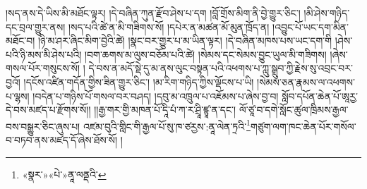 །སད་ནས་དེ་ཡིས་མི་མཐོང་ལྟར། །དེ་བཞིན་ཀུན་རྫོབ་ཤེས་པ་དག །བློ་གྲོས་མིག་ནི་བྱེ་གྱུར་ཅིང་། །མི་ཤེས་གཉིད་དང་བྲལ་གྱུར་ནས། །སད་པའི་ཚེ་ན་མི་གཟིགས་སོ། །དཔེར་ན་མཚན་མོ་མུན་ཁྲོད་ན། །འབྱུང་པོ་ཡང་དག་མིན་མཐོང་བ། །ཉི་མ་ཤར་ཞིང་མིག་བྱེའི་ཚེ། །སྣང་བར་གྱུར་པ་མ་ཡིན་ལྟར། །དེ་བཞིན་མཁས་པས་ཡང་དག་གི །ཤེས་པའི་ཉི་མས་མི་ཤེས་པའི། །བག་ཆགས་མ་ལུས་བཅོམ་པའི་ཚེ། །སེམས་དང་སེམས་བྱུང་ཡུལ་མི་གཟིགས། །ཞེས་གསལ་པོར་གསུངས་སོ། །
དེ་བས་ན་མདོ་སྡེ་དུ་མ་ནས་ལུང་བསྟན་པའི་འཕགས་པ་ཀླུ་སྒྲུབ་ཀྱི་རྗེས་སུ་འབྲང་བར་བྱའོ། །དངོས་འཛིན་གདོན་གྱིས་ཟིན་གྱུར་ཅིང་། །མ་རིག་གཉིད་ཀྱིས་ལྡོངས་པ་ཡི། །སེམས་ཅན་རྣམས་ལ་འཕགས་པ་ལྷས། །བདེན་པ་གཉིས་པོ་གསལ་བར་བཤད། །དབུ་མ་འཁྲུལ་པ་འཇོམས་པ་ཞེས་བྱ་བ། སློབ་དཔོན་ཆེན་པོ་ཨཱརྱ་དེ་བས་མཛད་པ་རྫོགས་སོ།། །།རྒྱ་གར་གྱི་མཁན་པོ་དཱི་པཾ་ཀ་ར་ཤྲཱི་ཛྙཱ་ན་དང་། ལོ་ཙཱ་བ་དགེ་སློང་ཚུལ་ཁྲིམས་རྒྱལ་བས་བསྒྱུར་ཅིང་ཞུས་པ། འཛམ་བུའི་གླིང་གི་རྒྱལ་པོ་སུ་ཁ་ཙརྱས་:ནཱ་ལེན་ཏྲའི་\footnote{«སྣར་»«པེ་»ནཱ་ལནྡའི་}གཙུག་ལག་ཁང་ཆེན་པོར་གསོལ་བ་བཏབ་ནས་མཛད་དོ་ཞེས་ཐོས་སོ། ། 